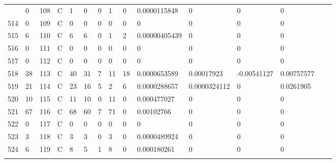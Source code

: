 \begin{longtable}{lllllllllllllll}
\begin{comment}
	513 & 0                 & 108 & C   & 1                 & 0                 & 0                 & 1    & 0          & 0.0000115848   & 0              & 0             & 0            \\
	514 & 0                 & 109 & C   & 0                 & 0                 & 0                 & 0    & 0          & 0              & 0              & 0             & 0            \\
	515 & 6                 & 110 & C   & 6                 & 6                 & 0                 & 1    & 2          & 0.00000405439  & 0              & 0             & 0            \\
	516 & 0                 & 111 & C   & 0                 & 0                 & 0                 & 0    & 0          & 0              & 0              & 0             & 0            \\
	517 & 0                 & 112 & C   & 0                 & 0                 & 0                 & 0    & 0          & 0              & 0              & 0             & 0            \\
	518 & 38                & 113 & C   & 40                & 31                & 7                 & 11   & 18         & 0.0000653589   & 0.00017923     & -0.00541127   & 0.00757577   \\
	519 & 21                & 114 & C   & 23                & 16                & 5                 & 2    & 6          & 0.0000288657   & 0.0000324112   & 0             & 0.0261905    \\
	520 & 10                & 115 & C   & 11                & 10                & 0                 & 11   & 0          & 0.000477027    & 0              & 0             & 0            \\
	521 & 67                & 116 & C   & 68                & 60                & 7                 & 71   & 0          & 0.00102766     & 0              & 0             & 0            \\
	522 & 0                 & 117 & C   & 0                 & 0                 & 0                 & 0    & 0          & 0              & 0              & 0             & 0            \\
	523 & 3                 & 118 & C   & 3                 & 3                 & 0                 & 3    & 0          & 0.0000489924   & 0              & 0             & 0            \\
	524 & 6                 & 119 & C   & 8                 & 5                 & 1                 & 8    & 0          & 0.000180261    & 0              & 0             & 0            \\

\end{comment}
\end{longtable}
